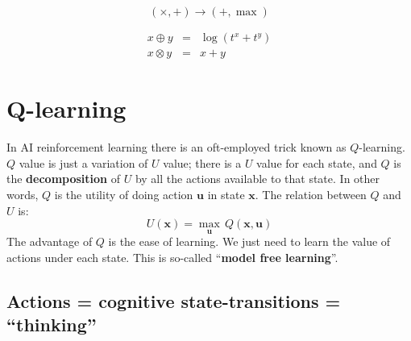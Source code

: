 \documentclass[orivec]{llncs}
\makeatletter
\newcommand{\emp}[1]{\textbf{#1}}
\newcommand{\vect}[1]{\boldsymbol{#1}}
\renewcommand{\boxed}[1]{\fbox{\m@th$\displaystyle\scalebox{0.9}{#1}$} \,}
\makeatother
\begin{document}
\begin{equation}
(\times, +) \rightarrow (+, \max)
\end{equation}

\begin{eqnarray}
x \oplus y    &=& \log (t ^x + t^y) \nonumber \\
x \otimes y &=& x + y
\end{eqnarray}


\section{Q-learning}

In AI reinforcement learning there is an oft-employed trick known as $Q$-learning.  $Q$ value is just a variation of $U$ value;  there is a $U$ value for each state, and $Q$ is the \textbf{decomposition} of $U$ by all the actions available to that state.  In other words, $Q$ is the utility of doing action $\vect{u}$ in state $\vect{x}$.  The relation between $Q$ and $U$ is:
\begin{equation}
U(\vect{x}) = \max\limits_{\vect{u}} \, Q(\vect{x}, \vect{u})
\end{equation}
The advantage of $Q$ is the ease of learning.  We just need to learn the value of actions under each state.  This is so-called ``\textbf{model free learning}''.



\subsection{Actions = cognitive state-transitions = ``thinking''}
\end{document}
